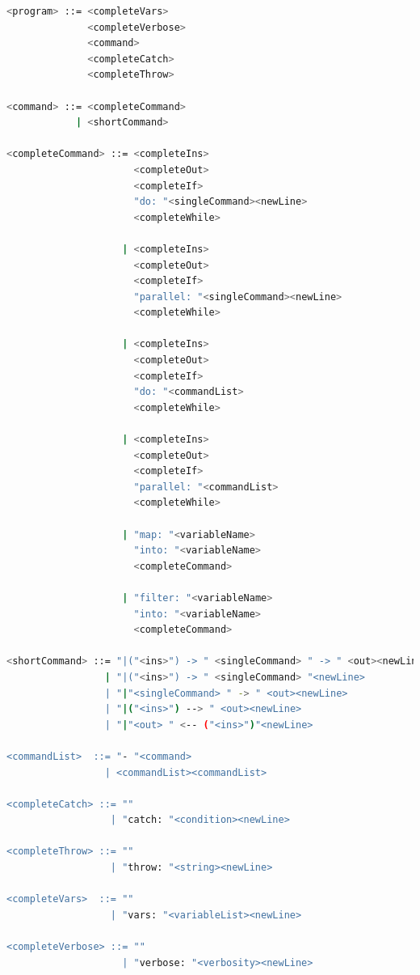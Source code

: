 \documentclass[conference]{IEEEtran}
\begin{document}
\begin{lstlisting}[caption=CHIML Semantic, label=chimlSemantic, language=bash, basicstyle=\small, breaklines=true]
<program> ::= <completeVars>
              <completeVerbose>
              <command>
              <completeCatch>
              <completeThrow>

<command> ::= <completeCommand>
            | <shortCommand>

<completeCommand> ::= <completeIns>
                      <completeOut>
                      <completeIf>
                      "do: "<singleCommand><newLine>
                      <completeWhile>

                    | <completeIns>
                      <completeOut>
                      <completeIf>
                      "parallel: "<singleCommand><newLine>
                      <completeWhile>

                    | <completeIns>
                      <completeOut>
                      <completeIf>
                      "do: "<commandList>
                      <completeWhile>

                    | <completeIns>
                      <completeOut>
                      <completeIf>
                      "parallel: "<commandList>
                      <completeWhile>

                    | "map: "<variableName>
                      "into: "<variableName>
                      <completeCommand>

                    | "filter: "<variableName>
                      "into: "<variableName>
                      <completeCommand>

<shortCommand> ::= "|("<ins>") -> " <singleCommand> " -> " <out><newLine>
                 | "|("<ins>") -> " <singleCommand> "<newLine>
                 | "|"<singleCommand> " -> " <out><newLine>
                 | "|("<ins>") --> " <out><newLine>
                 | "|"<out> " <-- ("<ins>")"<newLine>

<commandList>  ::= "- "<command>
                 | <commandList><commandList>

<completeCatch> ::= "" 
                  | "catch: "<condition><newLine>

<completeThrow> ::= ""
                  | "throw: "<string><newLine>

<completeVars>  ::= ""
                  | "vars: "<variableList><newLine>

<completeVerbose> ::= ""
                    | "verbose: "<verbosity><newLine>


\end{lstlisting}
\end{document}
